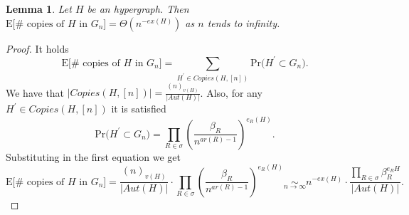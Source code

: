 \documentclass[12pt,notitlepage,a4paper]{article}
\newtheorem{lemma}{Lemma}[section]
\theoremstyle{definition}
\newcommand{\PR}[1]{\mathrm{Pr}\big(#1\big)}
\begin{document}
\begin{lemma}
	Let $H$ be an hypergraph. Then 
	$\mathrm{E}\big[\# \text{ copies of }H \text{ in } G_n\big]=
	\Theta(n^{-ex(H)})$ as $n$ tends to infinity.  
\end{lemma}
\begin{proof}
It holds
\[
 \mathrm{E}\big[\# \text{ copies of }H \text{ in } G_n\big]=
 \sum_{H^\prime \in Copies(H,[n])} \PR{H^\prime \subset G_n}.
\]	
We have that $|Copies(H,[n])|=\frac{(n)_{v(H)}}{|Aut(H)|}$. Also, 
for any $H^\prime \in Copies(H,[n])$ it is satisfied
\[
\PR{H^\prime \subset G_n}= \prod_{R\in \sigma} \left(\frac{\beta_R}{n^{ar(R)-1}} 
\right)^{e_R(H)}.
\]
Substituting in the first equation we get
\[
\mathrm{E}\big[\# \text{ copies of }H \text{ in } G_n\big]=
\frac{(n)_{v(H)}}{|Aut(H)|}\cdot
\prod_{R\in \sigma} \left(\frac{\beta_R}{n^{ar(R)-1}}\right)^{e_R(H)}
\underset{n \to \infty}{\sim}
n^{-ex(H)} \cdot \frac{\prod_{R\in \sigma} \beta_R^{
e_R{H} }}{|Aut(H)|}.
\]	




\end{proof}
\end{document}
